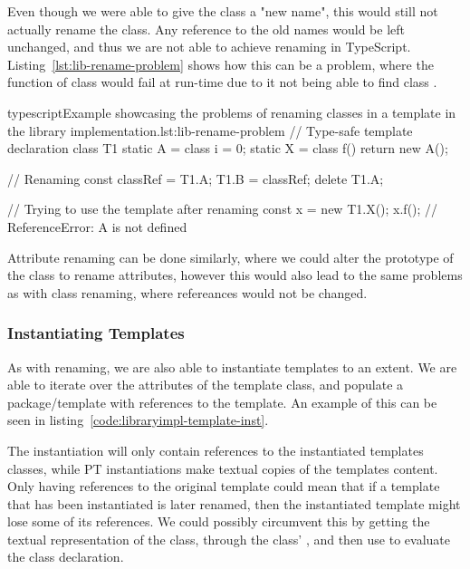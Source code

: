 Even though we were able to give the class a "new name", this would still not actually rename the class.
Any reference to the old names would be left unchanged, and thus we are not able to achieve renaming in TypeScript.
Listing~\vref{lst:lib-rename-problem} shows how this can be a problem, where the function  of class  would fail at run-time due to it not being able to find class .

\begin{code}{typescript}{Example showcasing the problems of renaming classes in a template in the library implementation.}{lst:lib-rename-problem}
    // Type-safe template declaration
    class T1 {
        static A = class {
            i = 0;
        }
        static X = class {
            f() {
                return new A();
            }
        }
    }

   // Renaming
    const classRef = T1.A;
    T1.B = classRef;
    delete T1.A;

    // Trying to use the template after renaming
    const x = new T1.X();
    x.f(); // ReferenceError: A is not defined
\end{code}

Attribute renaming can be done similarly, where we could alter the prototype of the class to rename attributes, however this would also lead to the same problems as with class renaming, where refereances would not be changed.

\subsubsection{Instantiating Templates}\label{subsubsec:instantiating-templates}

As with renaming, we are also able to instantiate templates to an extent.
We are able to iterate over the attributes of the template class, and populate a package/template with references to the template.
An example of this can be seen in listing~\vref{code:libraryimpl-template-inst}.


The instantiation will only contain references to the instantiated templates classes, while PT instantiations make textual copies of the templates content.
Only having references to the original template could mean that if a template that has been instantiated is later renamed, then the instantiated template might lose some of its references.
We could possibly circumvent this by getting the textual representation of the class, through the class' , and then use  to evaluate the class declaration.

